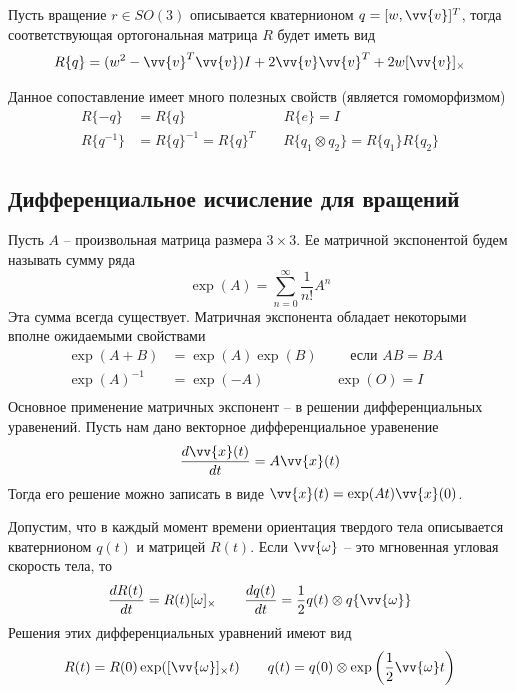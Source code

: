 \documentclass[12pt]{article}
\begin{document}
Пусть вращение $r\in SO(3)$ описывается кватернионом $q=[w, \vv{v}]^T$, тогда
соответствующая ортогональная матрица $R$ будет иметь вид
\begin{equation}
    R\{q\}=(w^2-\vv{v}^T\vv{v})I+2 \vv{v}\vv{v}^T+2 w [\vv{v}]_\times
\end{equation}

Данное сопоставление имеет много полезных свойств (является гомоморфизмом)
\begin{equation}
    \begin{aligned}
        R\{-q\}     & =R\{q\}
        \qquad\qquad\qquad\quad
        R\{e\}=I                            \\
        R\{q^{-1}\} & =R\{q\}^{-1}=R\{q\}^T
        \qquad
        R\{q_1\otimes q_2\}=R\{q_1\}R\{q_2\}
    \end{aligned}
\end{equation}

\subsection{Дифференциальное исчисление для вращений}\label{SubsectionMatrices}

Пусть $A$ -- произвольная матрица размера $3\times 3$. Ее матричной экспонентой
будем называть сумму ряда
\begin{equation}
    \exp(A)=\sum_{n=0}^\infty \frac{1}{n!} A^n
\end{equation}
Эта сумма всегда существует. Матричная экспонента обладает некоторыми вполне ожидаемыми свойствами
\begin{equation}
    \begin{aligned}
        \exp(A+B)    & =\exp(A)\exp(B) \qquad \mbox{ если $AB=BA$ } \\
        \exp(A)^{-1} & =\exp(-A)
        \qquad\qquad\quad
        \exp(O)=I                                                   \\
    \end{aligned}
\end{equation}
Основное применение матричных экспонент -- в решении дифференциальных уравенений.
Пусть нам дано векторное дифференциальное уравенение
\begin{equation}
    \frac{d \vv{x}(t)}{dt} = A \vv{x}(t)
\end{equation}
Тогда его решение можно записать в виде $\vv{x}(t)=\exp(A t) \vv{x}(0)$.

Допустим, что в каждый момент времени ориентация твердого тела описывается
кватернионом $q(t)$ и матрицей $R(t)$. Если $\vv{\omega}$ -- это мгновенная угловая
скорость тела, то
\begin{equation}
    \frac{d R(t)}{dt}=R(t)[\omega]_\times
    \qquad
    \frac{d q(t)}{d t}=\frac{1}{2} q(t)\otimes q\{\vv{\omega}\}
\end{equation}
Решения этих дифференциальных уравнений имеют вид
\begin{equation}
    R(t)=R(0)\exp([\vv{\omega}]_\times t)
    \qquad
    q(t)=q(0)\otimes \exp\left(\frac{1}{2}\vv{\omega} t\right)
\end{equation}
\end{document}
